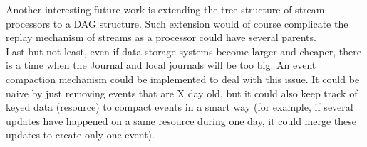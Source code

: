 Another interesting future work is extending the tree structure of stream processors to a DAG structure. Such extension would of course complicate the replay mechanism of streams as a processor could have several parents.
\\

Last but not least, even if data storage systems become larger and cheaper, there is a time when the Journal and local journals will be too big. An event compaction mechanism could be implemented to deal with this issue. It could be naive by just removing events that are X day old, but it could also keep track of keyed data (resource) to compact events in a smart way (for example, if several updates have happened on a same resource during one day, it could merge these updates to create only one event).



